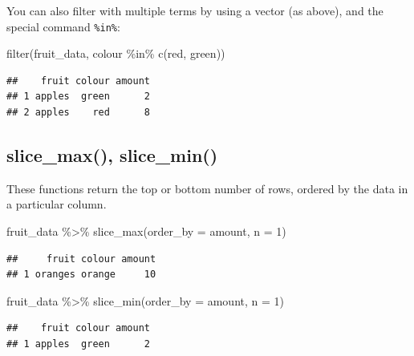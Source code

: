 \documentclass[
]{book}
\newenvironment{Shaded}{\begin{snugshade}}{\end{snugshade}}
\newcommand{\AttributeTok}[1]{\textcolor[rgb]{0.77,0.63,0.00}{#1}}
\newcommand{\DecValTok}[1]{\textcolor[rgb]{0.00,0.00,0.81}{#1}}
\newcommand{\FunctionTok}[1]{\textcolor[rgb]{0.00,0.00,0.00}{#1}}
\newcommand{\NormalTok}[1]{#1}
\newcommand{\SpecialCharTok}[1]{\textcolor[rgb]{0.00,0.00,0.00}{#1}}
\newcommand{\StringTok}[1]{\textcolor[rgb]{0.31,0.60,0.02}{#1}}
\begin{document}
You can also filter with multiple terms by using a vector (as above), and the special command \texttt{\%in\%}:

\begin{Shaded}
\begin{Highlighting}[]
\FunctionTok{filter}\NormalTok{(fruit\_data, colour }\SpecialCharTok{\%in\%} \FunctionTok{c}\NormalTok{(}\StringTok{\textquotesingle{}red\textquotesingle{}}\NormalTok{, }\StringTok{\textquotesingle{}green\textquotesingle{}}\NormalTok{))}
\end{Highlighting}
\end{Shaded}

\begin{verbatim}
##    fruit colour amount
## 1 apples  green      2
## 2 apples    red      8
\end{verbatim}

\hypertarget{slice_max-slice_min}{%
\subsection{slice\_max(), slice\_min()}\label{slice_max-slice_min}}

These functions return the top or bottom number of rows, ordered by the data in a particular column.

\begin{Shaded}
\begin{Highlighting}[]
\NormalTok{fruit\_data }\SpecialCharTok{\%\textgreater{}\%} \FunctionTok{slice\_max}\NormalTok{(}\AttributeTok{order\_by =}\NormalTok{ amount, }\AttributeTok{n =} \DecValTok{1}\NormalTok{)}
\end{Highlighting}
\end{Shaded}

\begin{verbatim}
##     fruit colour amount
## 1 oranges orange     10
\end{verbatim}

\begin{Shaded}
\begin{Highlighting}[]
\NormalTok{fruit\_data }\SpecialCharTok{\%\textgreater{}\%} \FunctionTok{slice\_min}\NormalTok{(}\AttributeTok{order\_by =}\NormalTok{ amount, }\AttributeTok{n =} \DecValTok{1}\NormalTok{)}
\end{Highlighting}
\end{Shaded}

\begin{verbatim}
##    fruit colour amount
## 1 apples  green      2
\end{verbatim}
\end{document}
